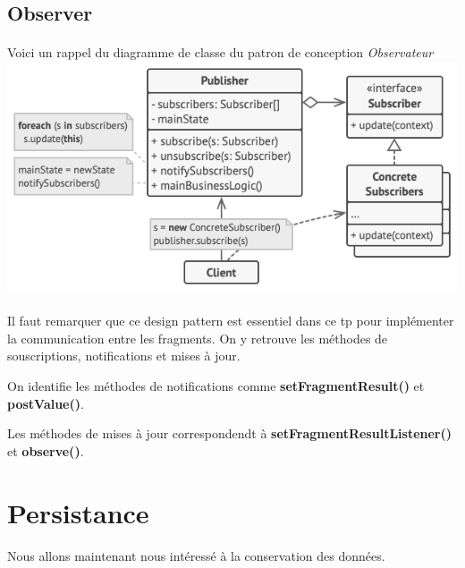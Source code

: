 \documentclass[a4paper]{article}
\begin{document}
\begin{multicols}{2}
            \subsection{Observer}
                \paragraph{}
                    Voici un rappel du diagramme de classe du patron de conception \emph{Observateur} 
                    \includegraphics[width=.49\textwidth]{observer}
                \paragraph{}
                    Il faut remarquer que ce design pattern est essentiel dans ce tp pour implémenter la communication entre les fragments. On y retrouve les méthodes de souscriptions, notifications et mises à jour.

                    On identifie les méthodes de notifications comme \textbf{setFragmentResult()} et \textbf{postValue()}.

                    Les méthodes de mises à jour correspondendt à \textbf{setFragmentResultListener()} et \textbf{observe()}.
        \section{Persistance}
            \paragraph{}
                Nous allons maintenant nous intéressé à la conservation des données.

\end{multicols}
\end{document}
